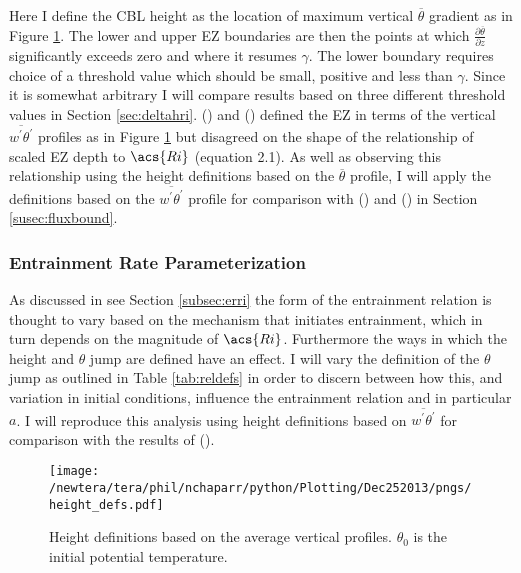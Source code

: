 Here I define the \acs{CBL} height as the location of maximum vertical $\overline{\theta}$ gradient as in Figure \ref{fig:hdefs}.  The lower and upper \acs{EZ} boundaries are then the points at which $\frac{\partial \overline{\theta}}{\partial z}$ significantly exceeds zero and where it resumes $\gamma$.  The lower boundary requires choice of a threshold value which should be small, positive and less than $\gamma$. Since it is somewhat arbitrary I will compare results based on three different threshold values in Section \ref{sec:deltahri}.  \citeauthor{FedConzMir04} (\citeyear{FedConzMir04}) and \citeauthor{BrooksFowler2} (\citeyear{BrooksFowler2}) defined the \acs{EZ} in terms of the vertical $\overline{w^{'}\theta^{'}}$ profiles as in Figure \ref{fig:hdefs} but disagreed on the shape of the relationship of scaled \acs{EZ} depth to $\acs{Ri}$ (equation 2.1).  As well as observing this relationship using the height definitions based on the $\overline{\theta}$ profile, I will apply the definitions based on the $\overline{w^{'}\theta^{'}}$ profile for comparison with \citeauthor{BrooksFowler2} (\citeyear{BrooksFowler2}) and \citeauthor{FedConzMir04} (\citeyear{FedConzMir04}) in Section \ref{susec:fluxbound}.\\  

\subsubsection{Entrainment Rate Parameterization}
As discussed in see Section \ref{subsec:erri} the form of the entrainment relation is thought to vary based on the mechanism that initiates entrainment, which in turn depends on the magnitude of $\acs{Ri}$.  Furthermore the ways in which the height and $\theta$ jump are defined have an effect. I will vary the definition of the $\theta$ jump as outlined in Table \ref{tab:reldefs} in order to discern between how this, and variation in initial conditions, influence the entrainment relation and in particular $a$. I will reproduce this analysis using height definitions based on $\overline{w^{'}\theta^{'}}$ for comparison with the results of \citeauthor{FedConzMir04} (\citeyear{FedConzMir04}).

\begin{figure}[htbp]
    \centering
    \texttt{[image: /newtera/tera/phil/nchaparr/python/Plotting/Dec252013/pngs/height\_defs.pdf]}
    \caption[Height definitions]{Height definitions based on the average vertical profiles. $\theta_{0}$ is the initial potential temperature.}
    \label{fig:hdefs}   %
\end{figure}

